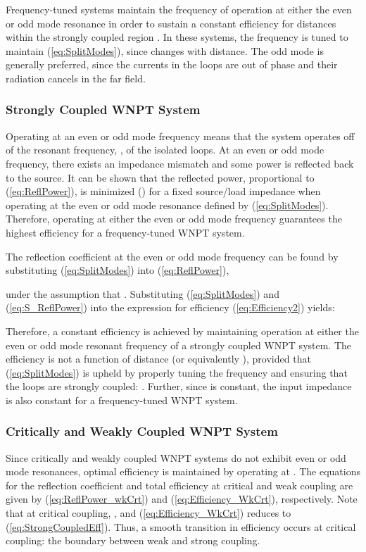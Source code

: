 \documentclass[journal]{IEEEtran}
\begin{document}
Frequency-tuned systems maintain the frequency of operation at either the even or odd mode resonance in order to sustain a constant efficiency for distances within the strongly coupled region \cite{Intel, Korea, VehicalPower, FreqTune-Exp}. In these systems, the frequency is tuned to maintain (\ref{eq:SplitModes}), since  changes with distance. The odd mode is generally preferred, since the currents in the loops are out of phase and their radiation cancels in the far field.

\subsubsection{Strongly Coupled WNPT System}

Operating at an even or odd mode frequency means that the system operates off of the resonant frequency, , of the isolated loops. At an even or odd mode frequency, there exists an impedance mismatch and some power is reflected back to the source. It can be shown that the reflected power, proportional to (\ref{eq:ReflPower}), is minimized () for a fixed source/load impedance when operating at the even or odd mode resonance defined by (\ref{eq:SplitModes}). Therefore, operating at either the even or odd mode frequency guarantees the highest efficiency for a frequency-tuned WNPT system.

The reflection coefficient at the even or odd mode frequency can be found by substituting (\ref{eq:SplitModes}) into (\ref{eq:ReflPower}),

under the assumption that . Substituting (\ref{eq:SplitModes}) and (\ref{eq:S_ReflPower}) into the expression for efficiency (\ref{eq:Efficiency2}) yields:

Therefore, a constant efficiency is achieved by maintaining operation at either the even or odd mode resonant frequency of a strongly coupled WNPT system. The efficiency is not a function of distance (or equivalently  ), provided that (\ref{eq:SplitModes}) is upheld by properly tuning the frequency  and ensuring that the loops are strongly coupled: . Further, since  is constant, the input impedance is also constant for a frequency-tuned WNPT system.

\subsubsection{Critically and Weakly Coupled WNPT System}

Since critically and weakly coupled WNPT systems do not exhibit even or odd mode resonances, optimal efficiency is maintained by operating at . The equations for the reflection coefficient  and total efficiency at critical and weak coupling are given by (\ref{eq:ReflPower_wkCrt}) and (\ref{eq:Efficiency_WkCrt}), respectively. Note that at critical coupling, , and (\ref{eq:Efficiency_WkCrt}) reduces to (\ref{eq:StrongCoupledEff}). Thus, a smooth transition in efficiency occurs at critical coupling: the boundary between weak and strong coupling.
\end{document}
